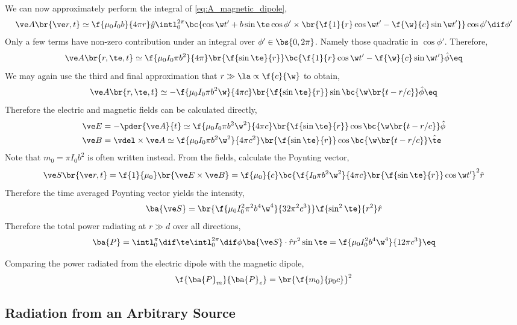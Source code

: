 \documentclass{article}
\begin{document}
We can now approximately perform the integral of \cref{eq:A_magnetic_dipole},
\[ \ve A\br{\ve r, t} \simeq \f{\mu_0 I_0 b}{4 \pi r} \hat y \intl_{0}^{2\pi} \bc{\cos \w t' + b \sin \te \cos \phi' \times \br{\f{1}{r} \cos \w t' - \f{\w}{c} \sin \w t'}} \cos \phi' \dif \phi' \]
Only a few terms have non-zero contribution under an integral over $\phi' \in \bs{0, 2\pi}$. Namely those quadratic in $\cos \phi'$. Therefore,
\[ \ve A\br{r, \te, t} \simeq \f{\mu_0 I_0 \pi b^2}{4 \pi}\br{\f{\sin \te}{r}} \bc{\f{1}{r} \cos \w t' - \f{\w}{c} \sin \w t'}\hat\phi \eq \label{eq:A_mag_no_approx}\]
We may again use the third and final approximation that $r \gg \la \propto \f{c}{\w}$ to obtain,
\[ \ve A\br{r, \te, t} \simeq -\f{\mu_0 I_0 \pi b^2 \w}{4 \pi c}\br{\f{\sin \te}{r}} \sin \bc{\w \br{t - r/c}} \hat\phi \eq \label{eq:A_mag}\]
Therefore the electric and magnetic fields can be calculated directly,
\begin{align*}
    \ve E &= - \pder{\ve A}{t} \simeq \f{\mu_0 I_0 \pi b^2 \w^2}{4 \pi c} \br{\f{\sin \te}{r}} \cos \bc{\w \br{t - r/c}}\hat \phi \\
    \ve B &= \vdel \times \ve A \simeq \f{\mu_0 I_0 \pi b^2 \w^2}{4 \pi c^2} \br{\f{\sin \te}{r}} \cos \bc{\w \br{t - r/c}}\hat \te
\end{align*}
Note that $m_0 = \pi I_0 b^2$ is often written instead. From the fields, calculate the Poynting vector,
\[ \ve S \br{\ve r, t} = \f{1}{\mu_0} \br{\ve E \times \ve B} = \f{\mu_0}{c} \bc{\f{I_0 \pi b^2 \w^2}{4 \pi c}\br{\f{\sin \te}{r}} \cos \w t'}^2 \hat r \]
Therefore the time averaged Poynting vector yields the intensity,
\[ \ba{\ve S} = \br{\f{\mu_0 I_0^2 \pi^2 b^4 \w^4}{32 \pi^2 c^3}}\f{\sin^2 \te}{r^2} \hat r \]
Therefore the total power radiating at $r \gg d$ over all directions,
\[ \ba{P} = \intl_{0}^{\pi} \dif \te \intl_{0}^{2 \pi} \dif \phi \ba{\ve S} \cdot \hat r r^2 \sin \te = \f{\mu_0 I_0^2 b^4 \w^4}{12 \pi c^3} \eq \label{eq:mag_dipole_radiation_power}\]

Comparing the power radiated from the electric dipole with the magnetic dipole,
\[ \f{\ba{P}_{m}}{\ba{P}_{e}} = \br{\f{m_0}{p_0c}}^2 \]

\subsection{Radiation from an Arbitrary Source}
\end{document}
